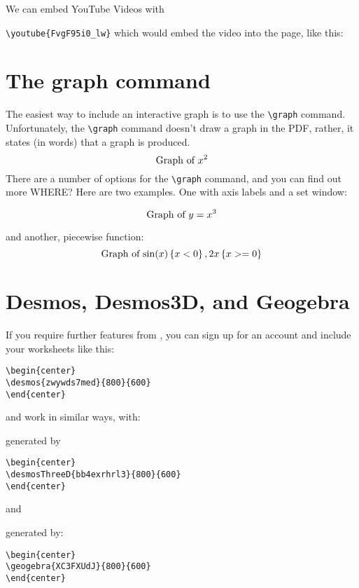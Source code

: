 \documentclass{ximera}
\begin{document}
We can embed YouTube Videos with

\verb|\youtube{FvgF95i0_lw}| which would embed the video into the page, like
this:
\begin{center}
\end{center}

\section{The graph command}

The easiest way to include an interactive graph is to use the
\verb|\graph| command. Unfortunately, the \verb|\graph| command
doesn't draw a graph in the PDF, rather, it states (in words) that a
graph is produced.
\[
  \graph{x^2}
\]
There are a number of options for the \verb|\graph| command, and you can find
out more WHERE?
Here are two examples. One with axis labels and a set window:

\[
  \graph[xAxisLabel="time", yAxisLabel="distance",xmin=0, xmax=10, ymin=0,
    ymax=10]{y=x^3}
\]

and another, piecewise function:
\[
  \graph{ \sin(x)\left\{x<0\right\}, 2x\left\{ x>=0 \right\} }
\]


\section{Desmos, Desmos3D, and Geogebra}

If you require further features from
, you can sign up for an account
and include your worksheets like this:

\begin{verbatim}
\begin{center}
\desmos{zwywds7med}{800}{600}
\end{center}
\end{verbatim}
\begin{center}
\end{center}

 and
 work in similar ways,
with:
\begin{center}
\end{center}
generated by
\begin{verbatim}
\begin{center}
\desmosThreeD{bb4exrhrl3}{800}{600}
\end{center}
\end{verbatim}
and
\begin{center}
\end{center}
generated by:
\begin{verbatim}
\begin{center}
\geogebra{XC3FXUdJ}{800}{600}
\end{center}
\end{verbatim}
\end{document}
